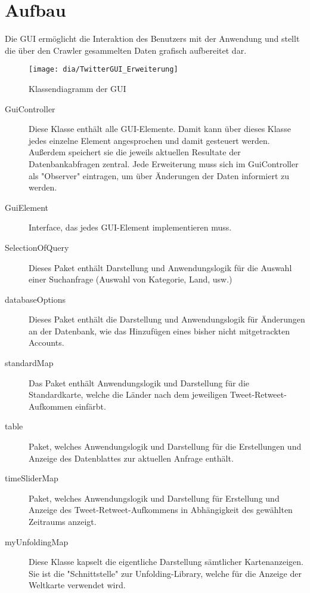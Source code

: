 \section{Aufbau}
Die GUI ermöglicht die Interaktion des Benutzers mit der Anwendung und stellt die über den Crawler gesammelten Daten grafisch aufbereitet dar. 
\begin{figure}[h!]
	\centering
	\texttt{[image: dia/TwitterGUI\_Erweiterung]}
	\caption{Klassendiagramm der GUI}
	\label{fig:GUI}
\end{figure}
\begin{description}
	\item[GuiController] Diese Klasse enthält alle GUI-Elemente. Damit kann über dieses Klasse jedes einzelne Element angesprochen und damit gesteuert werden. Außerdem speichert sie die jeweils aktuellen Resultate der Datenbankabfragen zentral. Jede Erweiterung muss sich im GuiController als "Observer" eintragen, um über Änderungen der Daten informiert zu werden. 
	\item[GuiElement] Interface, das jedes GUI-Element implementieren muss.
	\item [SelectionOfQuery] Dieses Paket enthält Darstellung und Anwendungslogik für die Auswahl einer Suchanfrage (Auswahl von Kategorie, Land, usw.)
	\item[databaseOptions] Dieses Paket enthält die Darstellung und Anwendungslogik für Änderungen an der Datenbank, wie das Hinzufügen eines bisher nicht mitgetrackten Accounts.
	
	\item [standardMap] Das Paket enthält Anwendungslogik und Darstellung für die Standardkarte, welche die Länder nach dem jeweiligen Tweet-Retweet-Aufkommen einfärbt.
	\item [table] Paket, welches Anwendungslogik und Darstellung für die Erstellungen und Anzeige des Datenblattes zur aktuellen Anfrage enthält.
	\item [timeSliderMap] Paket, welches Anwendungslogik und Darstellung für Erstellung und Anzeige des Tweet-Retweet-Aufkommens in Abhängigkeit des gewählten Zeitraums anzeigt.
	\item [myUnfoldingMap] Diese Klasse kapselt die eigentliche Darstellung sämtlicher Kartenanzeigen. Sie ist die "Schnittstelle" zur Unfolding-Library, welche für die Anzeige der Weltkarte verwendet wird.
\end{description}

